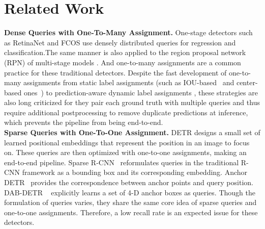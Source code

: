 \documentclass[10pt,twocolumn,letterpaper]{article}
\begin{document}
 \vspace{-5mm}

\section{Related Work}

\label{sec:related_work}
\noindent\textbf{Dense Queries with One-To-Many Assignment.}  One-stage detectors such as RetinaNet\cite{lin2017focal} and FCOS \cite{tian2019fcos} use densely distributed queries for regression and classification.The same manner is also applied to the region proposal network (RPN) of multi-stage models \cite{ren2015faster, cai2018cascade}. 
And one-to-many assignments are a common practice for these traditional detectors. Despite the fast development of one-to-many assignments from static label assignments (such as IOU-based~\cite{lin2017focal, ren2015faster, cai2018cascade} and center-based ones~\cite{tian2019fcos, kong2020foveabox}) to prediction-aware dynamic label assignments \cite{zhang2019freeanchor, zhu2020autoassign, ge2021ota, feng2021tood, li2022dual, chen2022diffusiondet}, these strategies are also long criticized for they pair each ground truth with multiple queries and thus require additional postprocessing to remove duplicate predictions at inference, which prevents the pipeline from being end-to-end. \\
\noindent\textbf{Sparse Queries with One-To-One Assignment.} DETR \cite{carion2020end} designs a small set of learned positional embeddings that represent the position in an image to focus on. These queries are then optimized with one-to-one assignments, making an end-to-end pipeline. Sparse R-CNN~\cite{sun2021sparse} reformulates queries in the traditional R-CNN framework as a bounding box and its corresponding embedding. Anchor DETR~\cite{wang2021anchor} provides the correspondence between anchor points and query position. DAB-DETR ~\cite{liu2021dab} explicitly learns a set of 4-D anchor boxes as queries. Though the formulation of queries varies, they share the same core idea of sparse queries and one-to-one assignments. Therefore, a low recall rate is an expected issue for these detectors. \\
\end{document}
